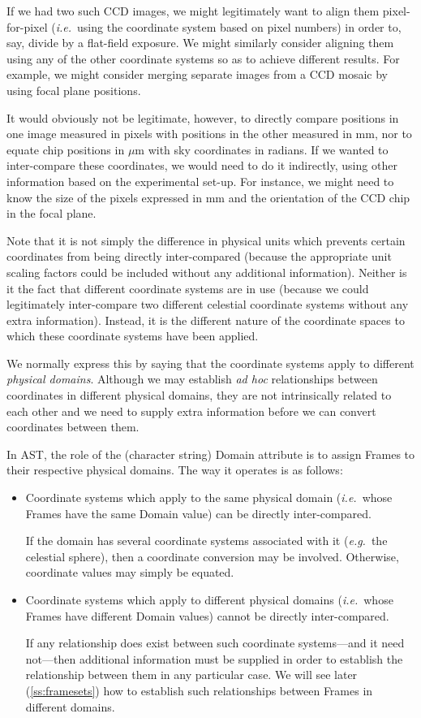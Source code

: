 \documentclass[twoside,11pt]{article}
\newcommand{\secref}[1]{\S\ref{#1}}
\renewcommand{\secref}[1]{\ref{#1}}
\begin{document}
If we had two such CCD images, we might legitimately want to align
them pixel-for-pixel ({\em{i.e.}}\ using the coordinate system based
on pixel numbers) in order to, say, divide by a flat-field exposure.
We might similarly consider aligning them using any of the other
coordinate systems so as to achieve different results. For example, we
might consider merging separate images from a CCD mosaic by using
focal plane positions.

It would obviously not be legitimate, however, to directly compare
positions in one image measured in pixels with positions in the other
measured in mm, nor to equate chip positions in $\mu$m with sky
coordinates in radians. If we wanted to inter-compare these
coordinates, we would need to do it indirectly, using other
information based on the experimental set-up. For instance, we might
need to know the size of the pixels expressed in mm and the
orientation of the CCD chip in the focal plane.

Note that it is not simply the difference in physical units which
prevents certain coordinates from being directly inter-compared
(because the appropriate unit scaling factors could be included
without any additional information). Neither is it the fact that
different coordinate systems are in use (because we could legitimately
inter-compare two different celestial coordinate systems without any
extra information).  Instead, it is the different nature of the
coordinate spaces to which these coordinate systems have been applied.

We normally express this by saying that the coordinate systems apply
to different {\em{physical domains}}. Although we may establish
{\em{ad hoc}} relationships between coordinates in different physical
domains, they are not intrinsically related to each other and we need
to supply extra information before we can convert coordinates between
them.

In AST, the role of the (character string) Domain attribute is to
assign Frames to their respective physical domains. The way it
operates is as follows:

\begin{itemize}
\item Coordinate systems which apply to the same physical domain
({\em{i.e.}}\ whose Frames have the same Domain value) can be directly
inter-compared.

If the domain has several coordinate systems associated with it
({\em{e.g.}}\ the celestial sphere), then a coordinate conversion may
be involved. Otherwise, coordinate values may simply be equated.

\item Coordinate systems which apply to different physical domains
({\em{i.e.}}\ whose Frames have different Domain values) cannot be
directly inter-compared.

If any relationship does exist between such coordinate systems---and
it need not---then additional information must be supplied in order to
establish the relationship between them in any particular case. We
will see later (\secref{ss:framesets}) how to establish such
relationships between Frames in different domains.
\end{itemize}
\end{document}
